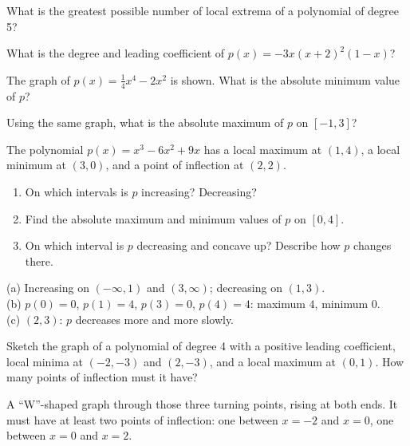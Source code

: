 \begin{exo}{}
What is the greatest possible number of local extrema of a polynomial of degree 5?
\end{exo}
\begin{exo}{}
What is the degree and leading coefficient of $p(x)=-3x(x+2)^2(1-x)$?
\end{exo}
\begin{exo}{}
The graph of $p(x)=\frac14x^4-2x^2$ is shown. What is the absolute minimum value of $p$?
\end{exo}
\begin{exo}{}
Using the same graph, what is the absolute maximum of $p$ on $[-1,3]$?
\end{exo}
\begin{exo}{}
The polynomial $p(x)=x^3-6x^2+9x$ has a local maximum at $(1,4)$, a local minimum at $(3,0)$, and a point of inflection at $(2,2)$.
\begin{enumerate}[label=(\alph*)]
\item On which intervals is $p$ increasing? Decreasing?
\item Find the absolute maximum and minimum values of $p$ on $[0,4]$.
\item On which interval is $p$ decreasing and concave up? Describe how $p$ changes there.
\end{enumerate}
\begin{solution}
(a) Increasing on $(-\infty,1)$ and $(3,\infty)$; decreasing on $(1,3)$.\\
(b) $p(0)=0$, $p(1)=4$, $p(3)=0$, $p(4)=4$: maximum $4$, minimum $0$.\\
(c) $(2,3)$: $p$ decreases more and more slowly.
\end{solution}
\end{exo}
\begin{exo}{}
Sketch the graph of a polynomial of degree 4 with a positive leading coefficient, local minima at $(-2,-3)$ and $(2,-3)$, and a local maximum at $(0,1)$. How many points of inflection must it have?
\begin{solution}
A ``W''-shaped graph through those three turning points, rising at both ends. It must have at least two points of inflection: one between $x=-2$ and $x=0$, one between $x=0$ and $x=2$.
\end{solution}
\end{exo}

